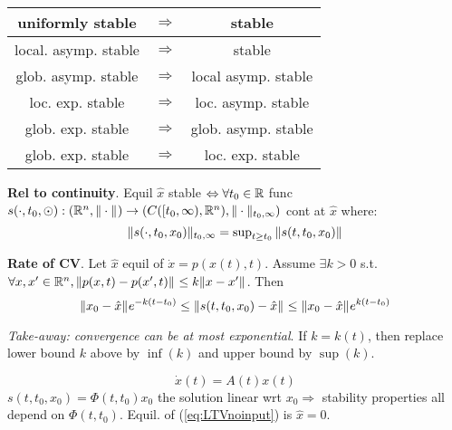 \begin{Fact}
\vspace{-4.5mm}
\begin{table}[H]
	\tiny
	\centering
	\begin{tabular}{c|c|c}
	uniformly stable & $\Rightarrow$ & stable \\ \hline
	local. asymp. stable & $\Rightarrow$ & stable \\ \hline
	glob. asymp. stable & $\Rightarrow$ & local asymp. stable \\ \hline
	loc. exp. stable & $\Rightarrow$ & loc. asymp. stable \\ \hline
	glob. exp. stable & $\Rightarrow$ & glob. asymp. stable \\ \hline
	glob. exp. stable & $\Rightarrow$ & loc. exp. stable \\  \hline
	\end{tabular}
\end{table}
\end{Fact}
\begin{Theorem}
\textbf{Rel to continuity}. Equil $\hat x$ stable $\Leftrightarrow\forall t_0\in\mathbb R$ func $s(\cdot,t_0,\odot):(\mathbb R^n,\|\cdot\|_{})\to(C([t_0,\infty),\mathbb R^n),\|\cdot\|_{t_0,\infty})$ cont at $\hat x$ where:
\begin{equation*}
\textstyle
\|s(\cdot,t_0,x_0)\|_{t_0,\infty}=\sup_{t\ge t_0}\|s(t,t_0,x_0)\|_{}
\end{equation*}
\end{Theorem}
\begin{Theorem}
\textbf{Rate of CV}. Let $\hat x$ equil of $\dot x=p(x(t),t)$. Assume $\exists k>0$ s.t. $\forall x,x'\in\mathbb R^n,\|p(x,t)-p(x',t)\|_{}\le k\|x-x'\|_{}$. Then
\begin{equation*}
\|x_0-\hat x\|_{}e^{-k(t-t_0)}\le\|s(t,t_0,x_0)-\hat x\|_{}\le\|x_0-\hat x\|_{}e^{k(t-t_0)}
\end{equation*}
\end{Theorem}
\textit{Take-away: convergence can be at most exponential}. If $k=k(t)$, then replace lower bound $k$ above by $\inf(k)$ and upper bound by $\sup(k)$.

\vspace{-2.5mm}
\begin{equation}\label{eq:LTVnoinput}
\dot x(t)=A(t)x(t)
\end{equation}
$s(t,t_0,x_0)=\Phi(t,t_0)x_0$ the solution linear wrt $x_0\Rightarrow$ stability properties all depend on $\Phi(t,t_0)$. Equil. of (\ref{eq:LTVnoinput}) is $\hat x=0$.

